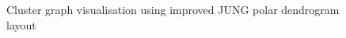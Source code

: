 \begin{figure}[h!]
{    \label{fig:cluster_jogl_impl_with_subgraph_2}
}
\caption{Cluster graph visualisation using improved JUNG polar dendrogram layout}
\end{figure}






